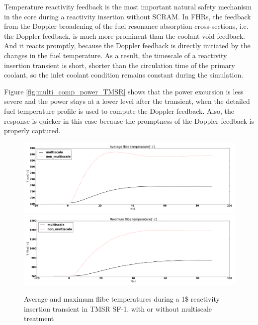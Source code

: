 \documentclass{elsarticle}
\begin{document}
Temperature reactivity feedback is the most important natural safety mechanism in the core during a reactivity insertion without SCRAM. In FHRs, the feedback from the Doppler broadening of the fuel resonance absorption cross-sections, i.e. the Doppler feedback, is much more prominent than the coolant void feedback. And it reacts promptly, because the Doppler feedback is directly initiated by the changes in the fuel temperature. As a result, the timescale of a reactivity insertion transient is short, shorter than the circulation time of the primary coolant, so the inlet coolant condition remains constant during the simulation.



Figure \ref{fig:multi_comp_power_TMSR} shows that the power excursion is less severe and the power stays at a lower level after the transient, when the detailed fuel temperature profile is used to compute the Doppler feedback. Also, the response is quicker in this case because the promptness of the Doppler feedback is properly captured. 

\begin{figure}
    \centering
    \includegraphics[width=\textwidth]{images/diffusion/tmsr/RI/compare_multiscale/T_flibe_ave.png}
    \includegraphics[width=\textwidth]{images/diffusion/tmsr/RI/compare_multiscale/T_flibe_max.png}
    \caption{Average and maximum flibe temperatures during a 1\$ reactivity insertion transient in TMSR SF-1, with or without multiscale treatment}
    \label{fig:multi_comp_flibe_TMSR}
\end{figure}
\end{document}
